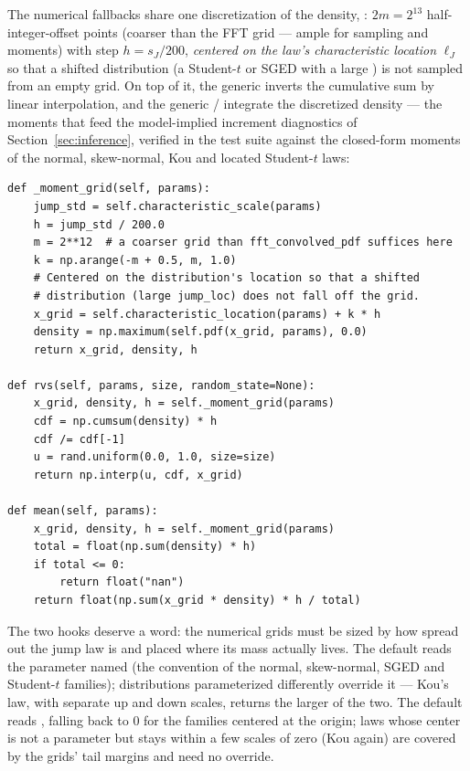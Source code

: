 The numerical fallbacks share one discretization of the density,
: $2m = 2^{13}$ half-integer-offset points (coarser
than the FFT grid --- ample for sampling and moments) with step
$h = s_J / 200$, \emph{centered on the law's characteristic location}
$\ell_J$ so that a shifted distribution (a Student-$t$ or SGED with a
large ) is not sampled from an empty grid. On top of it,
the generic  inverts the cumulative sum by linear
interpolation, and the generic / integrate the
discretized density --- the moments that feed the model-implied increment
diagnostics of Section~\ref{sec:inference}, verified in the test suite
against the closed-form moments of the normal, skew-normal, Kou and
located Student-$t$ laws:

\begin{lstlisting}[caption={Shared grid, inverse-CDF sampling and numerical moments in \code{distributions/base.py} (excerpts).}]
def _moment_grid(self, params):
    jump_std = self.characteristic_scale(params)
    h = jump_std / 200.0
    m = 2**12  # a coarser grid than fft_convolved_pdf suffices here
    k = np.arange(-m + 0.5, m, 1.0)
    # Centered on the distribution's location so that a shifted
    # distribution (large jump_loc) does not fall off the grid.
    x_grid = self.characteristic_location(params) + k * h
    density = np.maximum(self.pdf(x_grid, params), 0.0)
    return x_grid, density, h

def rvs(self, params, size, random_state=None):
    x_grid, density, h = self._moment_grid(params)
    cdf = np.cumsum(density) * h
    cdf /= cdf[-1]
    u = rand.uniform(0.0, 1.0, size=size)
    return np.interp(u, cdf, x_grid)

def mean(self, params):
    x_grid, density, h = self._moment_grid(params)
    total = float(np.sum(density) * h)
    if total <= 0:
        return float("nan")
    return float(np.sum(x_grid * density) * h / total)
\end{lstlisting}

The two  hooks deserve a word: the numerical
grids must be sized by how spread out the jump law is and placed where
its mass actually lives. The default  reads
the parameter named  (the convention of the normal,
skew-normal, SGED and Student-$t$ families); distributions parameterized
differently override it --- Kou's law, with separate up and down scales,
returns the larger of the two. The default
 reads , falling back to
$0$ for the families centered at the origin; laws whose center is not a
parameter but stays within a few scales of zero (Kou again) are covered
by the grids' tail margins and need no override.

